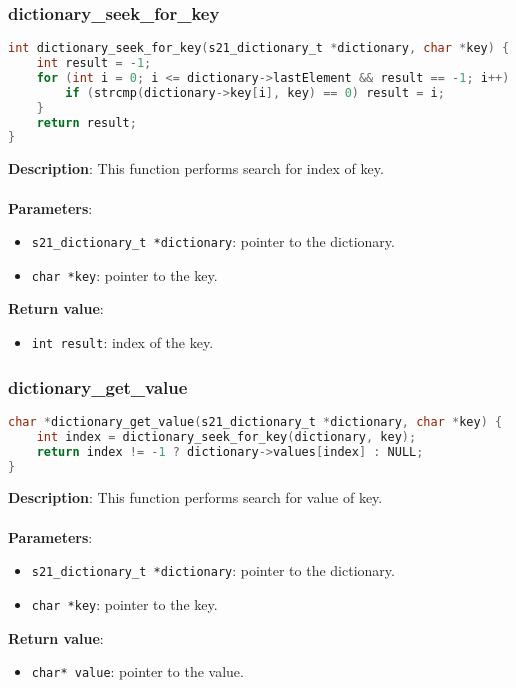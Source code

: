 \documentclass{article}
\begin{document}
\subsubsection{dictionary\_seek\_for\_key}
\begin{lstlisting}[language=C]
int dictionary_seek_for_key(s21_dictionary_t *dictionary, char *key) {
    int result = -1;
    for (int i = 0; i <= dictionary->lastElement && result == -1; i++) {
        if (strcmp(dictionary->key[i], key) == 0) result = i;
    }
    return result;
}
\end{lstlisting}
\noindent
\textbf{Description}: This function performs search for index of key.\\\\
\textbf{Parameters}:
\begin{itemize}
    \item \texttt{s21\_dictionary\_t *dictionary}: pointer to the dictionary.
    \item \texttt{char *key}: pointer to the key.
\end{itemize}
\textbf{Return value}:
\begin{itemize}
    \item \texttt{int result}: index of the key.
\end{itemize}

\subsubsection{dictionary\_get\_value}
\begin{lstlisting}[language=C]
char *dictionary_get_value(s21_dictionary_t *dictionary, char *key) {
    int index = dictionary_seek_for_key(dictionary, key);
    return index != -1 ? dictionary->values[index] : NULL;
}
\end{lstlisting}
\noindent
\textbf{Description}: This function performs search for value of key.\\\\
\textbf{Parameters}:
\begin{itemize}
    \item \texttt{s21\_dictionary\_t *dictionary}: pointer to the dictionary.
    \item \texttt{char *key}: pointer to the key.
\end{itemize}
\textbf{Return value}:
\begin{itemize}
    \item \texttt{char* value}: pointer to the value.
\end{itemize}
\end{document}
